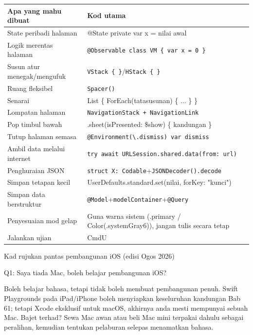 


\begin{center}
\begin{tabularx}{\linewidth}{|X|X|}
\hline
\textbf{Apa yang mahu dibuat} & \textbf{Kod utama} \tabularnewline
\hline
State peribadi halaman & @State private var x = nilai awal \tabularnewline
Logik merentas halaman & \texttt{@Observable class VM \{ var x = 0 \}} \tabularnewline
Susun atur menegak/mengufuk & \texttt{VStack \{ \}}/\texttt{HStack \{ \}} \tabularnewline
Ruang fleksibel & \texttt{Spacer()} \tabularnewline
Senarai & List \{ ForEach(tatasusunan) \{ ... \} \} \tabularnewline
Lompatan halaman & \texttt{NavigationStack + NavigationLink} \tabularnewline
Pop timbul bawah & .sheet(isPresented: \$show) \{ kandungan \} \tabularnewline
Tutup halaman semasa & \texttt{@Environment(\textbackslash{}.\allowbreak dismiss) var dismiss} \tabularnewline
Ambil data melalui internet & \texttt{try await URLSession.\allowbreak shared.\allowbreak data(from: url)} \tabularnewline
Penghuraian JSON & \texttt{struct X: Codable}+\texttt{JSONDecoder().\allowbreak decode} \tabularnewline
Simpan tetapan kecil & UserDefaults.standard.set(nilai, forKey: "kunci") \tabularnewline
Simpan data berstruktur & \texttt{@Model}+\texttt{modelContainer}+\texttt{@Query} \tabularnewline
Penyesuaian mod gelap & Guna warna sistem (.primary / Color(.systemGray6)), jangan tulis secara tetap \tabularnewline
Jalankan ujian & CmdU \tabularnewline
\hline
\end{tabularx}
\end{center}

\begin{center}\small\color{gray}Kad rujukan pantas pembangunan iOS (edisi Ogos 2026)\end{center}


Q1: Saya tiada Mac, boleh belajar pembangunan iOS?

Boleh belajar bahasa, tetapi tidak boleh membuat pembangunan penuh. Swift Playgrounds pada iPad/iPhone boleh menyiapkan keseluruhan kandungan Bab 61; tetapi Xcode eksklusif untuk macOS, akhirnya anda mesti mempunyai sebuah Mac. Bajet terhad? Sewa Mac awan atau beli Mac mini terpakai dahulu sebagai peralihan, kemudian tentukan pelaburan selepas menamatkan bahasa.

